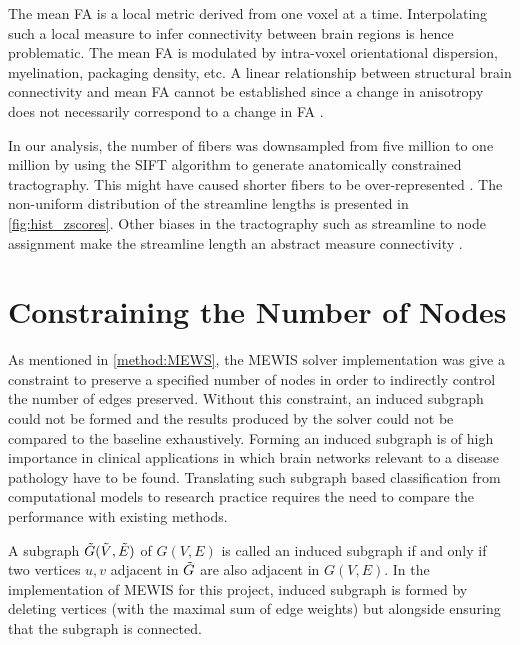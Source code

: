 \documentclass[msthesis.tex]{subfiles}
\begin{document}
The mean \gls{FA} is a local metric derived from one voxel at a time. Interpolating such a local measure to infer connectivity between brain regions is hence problematic. The mean \gls{FA} is modulated by intra-voxel orientational dispersion, myelination, packaging density, etc. A linear relationship between structural brain connectivity and mean \gls{FA} cannot be established since a change in anisotropy does not necessarily correspond to a change in \gls{FA} \citep{JONES2013239}.

In our analysis, the number of fibers was downsampled from five million to one million by using the \gls{SIFT} algorithm to generate anatomically constrained tractography. This might have caused shorter fibers to be over-represented \citep{smith2015effects}. The non-uniform distribution of the streamline lengths is presented in \cref{fig:hist_zscores}. Other biases in the tractography such as streamline to node assignment make the streamline length an abstract measure connectivity \citep{yeh2020mapping}. 
\section{Constraining the Number of Nodes}
As mentioned in \autoref{method:MEWS}, the \gls{MEWIS} solver implementation was give a constraint to preserve a specified number of nodes in order to indirectly control the number of edges preserved. Without this constraint, an induced subgraph could not be formed and the results produced by the solver could not be compared to the baseline exhaustively. Forming an induced subgraph is of high importance in clinical applications in which brain networks relevant to a disease pathology have to be found. Translating such subgraph based classification from computational models to research practice requires the need to compare the performance with existing methods.

A subgraph $\Tilde{G}(\Tilde{V}, \Tilde{E})$ of $G (V,E)$ is called an induced subgraph if and only if two vertices $u,v$  adjacent in $\Tilde{G}$ are also adjacent in $G(V,E)$. In the implementation of \gls{MEWIS} for this project, induced subgraph is formed by deleting vertices (with the maximal sum of edge weights) but alongside ensuring that the subgraph is connected. 
\end{document}
